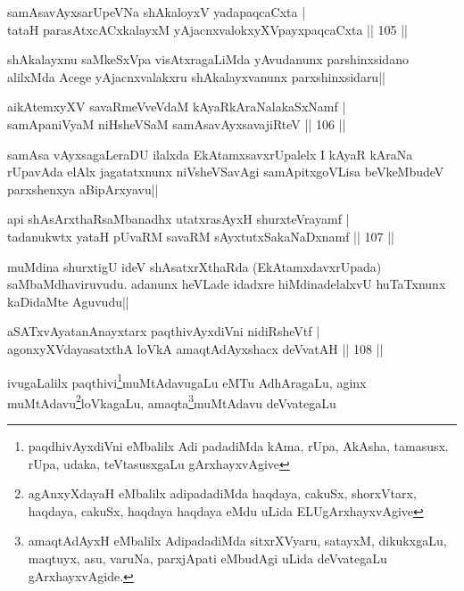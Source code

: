 \begin{shl}
samAsavAyxsarUpeVNa shAkaloyxV yadapaqcaCxta |\\
tataH parasAtxcACxkalayxM yAjacnxvalokxyXV\s payxpaqcaCxta \hfill || 105 ||
\end{shl}

\begin{artha}
shAkalayxnu saMkeSxVpa visAtxragaLiMda yAvudanunx parshinxsidano alilxMda Acege yAjacnxvalakxru shAkalayxvanunx parxshinxsidaru||
\end{artha}


\begin{shl}
aikAtemxyXV savaRmeVveVdaM kAyaRkAraNalakaSxNamf |\\
samApaniVyaM niHsheVSaM samAsavAyxsavajiRteV \hfill || 106 ||
\end{shl}

\begin{artha}
samAsa vAyxsagaLeraDU ilalxda EkAtamxsavxrUpalelx I kAyaR kAraNa rUpavAda elAlx jagatatxnunx niVsheVSavAgi samApitxgoVLisa beVkeMbudeV parxshenxya aBipArxyavu||
\end{artha}

\begin{shl}
api shAsArxthaRsaMbanadhx utatxrasAyxH shurxteVrayamf |\\
tadanukwtx yataH pUvaRM savaRM sAyxtutxSakaNaDxnamf \hfill || 107 ||
\end{shl}

\begin{artha}
muMdina shurxtigU ideV shAsatxrXthaRda (EkAtamxdavxrUpada) saMbaMdhaviruvudu. adanunx heVLade idadxre hiMdinadelalxvU huTaTxnunx kaDidaMte Aguvudu||
\end{artha}


\begin{shl}
aSATxvAyatanAnayxtarx paqthivAyxdiVni nidiRsheVtf |\\
agonxyXVdayasatxthA loVkA amaqtAdAyxshacx deVvatAH \hfill || 108 ||
\end{shl}

\begin{artha}
ivugaLalilx paqthivi\footnote[1]{paqdhivAyxdiVni eMbalilx Adi padadiMda kAma, rUpa, AkAsha, tamasusx. rUpa, udaka, teVtasusxgaLu gArxhayxvAgive}muMtAdavugaLu eMTu AdhAragaLu, aginx muMtAdavu\footnote[2]{agAnxyXdayaH eMbalilx adipadadiMda haqdaya, cakuSx, shorxVtarx, haqdaya, cakuSx, haqdaya haqdaya eMdu uLida ELUgArxhayxvAgive}loVkagaLu, amaqta\footnote[3]{amaqtAdAyxH eMbalilx AdipadadiMda sitxrXVyaru, satayxM, dikukxgaLu, maqtuyx, asu, varuNa, parxjApati eMbudAgi uLida deVvategaLu gArxhayxvAgide.}muMtAdavu deVvategaLu 
\end{artha}

